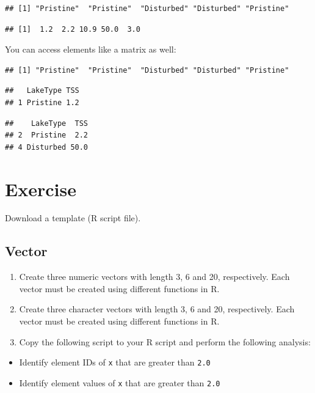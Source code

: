 \documentclass[
]{book}
\providecommand{\tightlist}{%
  \setlength{\itemsep}{0pt}\setlength{\parskip}{0pt}}
\begin{document}
\begin{verbatim}
## [1] "Pristine"  "Pristine"  "Disturbed" "Disturbed" "Pristine"
\end{verbatim}

\begin{verbatim}
## [1]  1.2  2.2 10.9 50.0  3.0
\end{verbatim}

You can access elements like a matrix as well:

\begin{verbatim}
## [1] "Pristine"  "Pristine"  "Disturbed" "Disturbed" "Pristine"
\end{verbatim}

\begin{verbatim}
##   LakeType TSS
## 1 Pristine 1.2
\end{verbatim}

\begin{verbatim}
##    LakeType  TSS
## 2  Pristine  2.2
## 4 Disturbed 50.0
\end{verbatim}

\hypertarget{exercise}{%
\section{Exercise}\label{exercise}}

Download a template (R script file).

\hypertarget{vector-1}{%
\subsection{Vector}\label{vector-1}}

\begin{enumerate}
\def\labelenumi{\alph{enumi}.}
\tightlist
\item
  Create three numeric vectors with length 3, 6 and 20, respectively. Each vector must be created using different functions in R.
\item
  Create three character vectors with length 3, 6 and 20, respectively. Each vector must be created using different functions in R.
\item
  Copy the following script to your R script and perform the following analysis:
\end{enumerate}

\begin{itemize}
\tightlist
\item
  Identify element IDs of \texttt{x} that are greater than \texttt{2.0}
\item
  Identify element values of \texttt{x} that are greater than \texttt{2.0}
\end{itemize}
\end{document}
